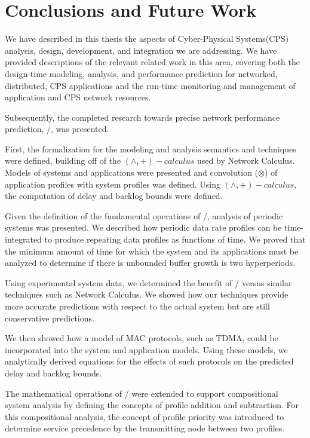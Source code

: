\chapter{Conclusions and Future Work}
\label{ch:conclusions}

We have described in this thesis the aspects of Cyber-Physical
Systems(CPS) analysis, design, development, and integration we are
addressing.  We have provided descriptions of the relevant related
work in this area, covering both the design-time modeling, analysis,
and performance prediction for networked, distributed, CPS
applications and the run-time monitoring and management of application
and CPS network resources.

Subsequently, the completed research towards precise network
performance prediction, \shorttool/, was presented. 

First, the formalization for the modeling and analysis semantics and
techniques were defined, building off of the $(\wedge,+)-calculus$
used by Network Calculus.  Models of systems and applications were
presented and convolution ($\otimes$) of application profiles with
system profiles was defined.  Using $(\wedge,+)-calculus$, the
computation of delay and backlog bounds were defined.

Given the definition of the fundamental operations of \shorttool/,
analysis of periodic systems was presented.  We described how periodic
data rate profiles can be time-integrated to produce repeating data
profiles as functions of time.  We proved that the minimum amount of
time for which the system and its applications must be analyzed to
determine if there is unbounded buffer growth is two hyperperiods.

Using experimental system data, we determined the benefit of
\shorttool/ versus similar techniques such as Network Calculus.  We
showed how our techniques provide more accurate predictions with
respect to the actual system but are still conservative predictions.  

We then showed how a model of MAC protocols, such as TDMA, could be
incorporated into the system and application models.  Using these
models, we analytically derived equations for the effects of such
protocols on the predicted delay and backlog bounds.

The mathematical operations of \shorttool/ were extended to support
compositional system analysis by defining the concepts of profile
addition and subtraction.  For this compositional analysis, the
concept of profile priority was introduced to determine service
precedence by the transmitting node between two profiles.

